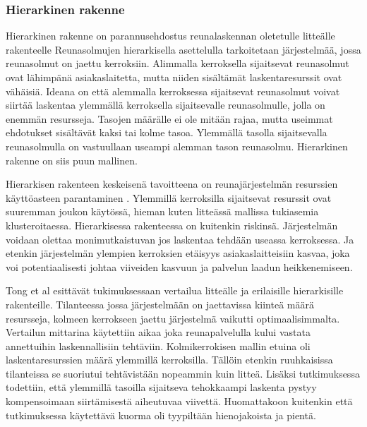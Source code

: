 

\subsubsection{Hierarkinen rakenne}
Hierarkinen rakenne on parannusehdostus reunalaskennan oletetulle litteälle rakenteelle \cite{tong2016hierarchical}
Reunasolmujen hierarkisella asettelulla tarkoitetaan järjestelmää, jossa reunasolmut on jaettu kerroksiin. Alimmalla kerroksella sijaitsevat reunasolmut ovat lähimpänä asiakaslaitetta, mutta niiden sisältämät laskentaresurssit ovat vähäisiä. 
Ideana on että alemmalla kerroksessa sijaitsevat reunasolmut voivat siirtää laskentaa ylemmällä kerroksella sijaitsevalle reunasolmulle, jolla on enemmän resursseja. Tasojen määrälle ei ole mitään rajaa, mutta useimmat ehdotukset sisältävät kaksi tai kolme tasoa.
Ylemmällä tasolla sijaitsevalla reunasolmulla on vastuullaan useampi alemman tason reunasolmu. Hierarkinen rakenne on siis puun mallinen.

Hierarkisen rakenteen keskeisenä tavoitteena on reunajärjestelmän resurssien käyttöasteen parantaminen \cite{tong2016hierarchical}. Ylemmillä kerroksilla sijaitsevat resurssit ovat suuremman joukon käytössä, hieman kuten litteässä mallissa tukiasemia klusteroitaessa. 
Hierarkisessa rakenteessa on kuitenkin riskinsä. Järjestelmän voidaan olettaa monimutkaistuvan jos laskentaa tehdään useassa kerroksessa. Ja etenkin järjestelmän ylempien kerroksien etäisyys asiakaslaitteisiin kasvaa, joka voi potentiaalisesti johtaa viiveiden kasvuun ja palvelun laadun heikkenemiseen.

Tong et al \cite{tong2016hierarchical} esittävät tukimuksessaan vertailua litteälle ja erilaisille hierarkisille rakenteille. Tilanteessa jossa järjestelmään on jaettavissa kiinteä määrä resursseja, kolmeen kerrokseen jaettu järjestelmä vaikutti optimaalisimmalta.
Vertailun mittarina käytettiin aikaa joka reunapalvelulla kului vastata annettuihin laskennallisiin tehtäviin. Kolmikerrokisen mallin etuina oli laskentaresurssien määrä ylemmillä kerroksilla. Tällöin etenkin ruuhkaisissa tilanteissa se suoriutui tehtävistään nopeammin kuin litteä. Lisäksi tutkimuksessa todettiin, että ylemmillä tasoilla sijaitseva tehokkaampi laskenta pystyy kompensoimaan siirtämisestä aiheutuvaa viivettä. Huomattakoon kuitenkin että tutkimuksessa käytettävä kuorma oli tyypiltään hienojakoista ja pientä. 


